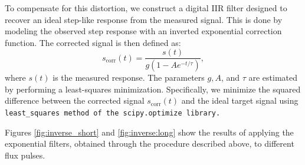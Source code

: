 To compensate for this distortion, we construct a digital IIR filter designed to recover an ideal step-like response from the measured signal. 
This is done by modeling the observed step response with an inverted exponential correction function. The corrected signal is then defined as:
\begin{equation}\label{eq:inverse}
s_{\text{corr}}(t) = \frac{s(t)}{g(1 - Ae^{-t/\tau})},
\end{equation}
where $s(t)$ is the measured response. 
The parameters $g, A$, and $\tau$  are estimated by performing a least-squares minimization. 
Specifically, we minimize the squared difference between the corrected signal $s_{\text{corr}}(t)$ and the ideal target signal using \tt{least\_squares} method of the \tt{scipy.optimize} library.

Figures \ref{fig:inverse_short} and \ref{fig:inverse:long} show the results of applying the exponential filters, obtained through the procedure described above, to different flux pulses.


